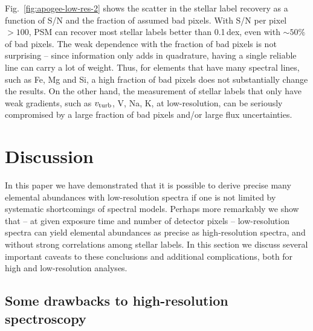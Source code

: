 \documentclass[iop]{emulateapj}
\begin{document}
\begin{CJK*}{UTF8}{gbsn}
Fig.~\ref{fig:apogee-low-res-2} shows the scatter in the stellar label recovery as a function of S/N and the fraction of assumed bad pixels.  With S/N per pixel $> 100$, PSM can recover most stellar labels better than 0.1$\,$dex, even with $\sim 50\%$ of bad pixels. The weak dependence with the fraction of bad pixels is not surprising -- since information only adds in quadrature, having a single reliable line can carry a lot of weight. Thus, for elements that have many spectral lines, such as Fe, Mg and Si, a high fraction of bad pixels does not substantially change the results. On the other hand, the measurement of stellar labels that only have weak gradients, such as $v_{\rm turb}$, V, Na, K, at low-resolution, can be seriously compromised by a large fraction of bad pixels and/or large flux uncertainties. 


%
%
%
%
%
%


\section{Discussion}
\label{sec:discussions}

In this paper we have demonstrated that it is possible to derive precise many elemental abundances with low-resolution spectra if one is not limited by systematic shortcomings of spectral models. Perhaps more remarkably we show that -- at given exposure time and number of detector pixels -- low-resolution spectra can yield elemental abundances as precise as high-resolution spectra, and without strong correlations among stellar labels. In this section we discuss several important caveats to these conclusions and additional complications, both for high and low-resolution analyses.


%
%
%
%
%
%

\subsection{Some drawbacks to high-resolution spectroscopy}
\label{sec:throughput}


\end{CJK*}
\end{document}
